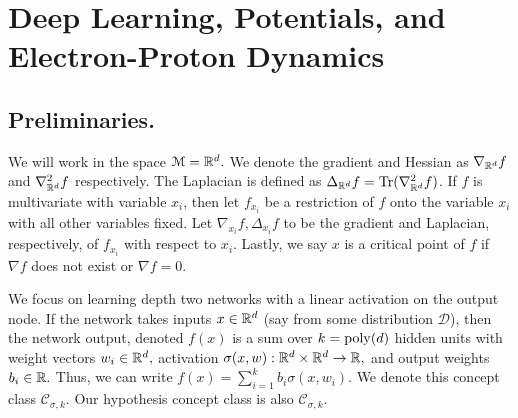 \section{Deep Learning, Potentials, and Electron-Proton Dynamics}
\label{sec:epdyn}
\subsection{Preliminaries.}
We will work in the space  $\mathcal{M}= {\mathbb{R}}^d.$ 
We denote the gradient and Hessian as $\nabla_{{\mathbb{R}}^d} f$ and  $\nabla_{{\mathbb{R}}^d}^2 f$ respectively.
The Laplacian is defined as
$\Delta_{{\mathbb{R}}^d} f = \operatorname{Tr}(\nabla_{{\mathbb{R}}^d}^2 f)$. 
%
If $f$ is multivariate with variable $x_i$, then let $f_{x_i}$ be a
restriction of $f$ onto the variable $x_i$ with all other variables
fixed. Let $\nabla_{x_i}f, \Delta_{x_i}f$ to be the gradient and
Laplacian, respectively, of $f_{x_i}$ with respect to $x_i$. Lastly,
we say $x$ is a critical point of $f$ if $\nabla f$ does not exist or
$\nabla f = 0$. 

We focus on learning depth two networks with a linear activation on
the output node. If the network takes inputs $x \in {\mathbb{R}}^d$ (say from
some distribution $\mathcal{D}$), then the network output, denoted
$f(x)$ is a sum over $k = \mathrm{poly}(d)$ hidden units with weight vectors
$w_{i} \in {\mathbb{R}}^d,$ activation $\sigma(x,w):{\mathbb{R}}^d \times {\mathbb{R}}^d\to {\mathbb{R}},$ and
output weights $b_i \in {\mathbb{R}}.$ Thus, we can write
$f(x) = \sum_{i=1}^k b_i\sigma(x,w_i)$. We denote this concept class
$\mathcal{C}_{\sigma,k}.$ Our hypothesis concept class is also
$\mathcal{C}_{\sigma,k}.$ 





 

